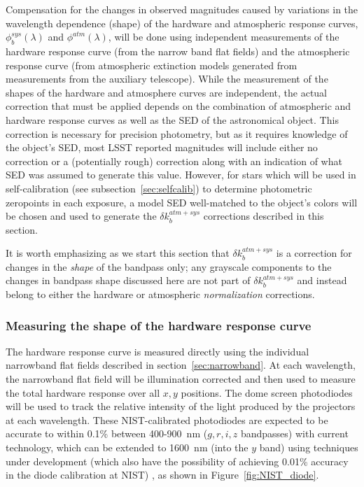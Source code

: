 \documentclass[12pt,preprint]{aastex}
\begin{document}
Compensation for the changes in observed magnitudes caused by
variations in the wavelength dependence (shape) of the hardware and
atmospheric response curves, $\phi_b^{sys}(\lambda)$ and
$\phi^{atm}(\lambda)$, will be done using independent measurements of
the hardware response curve (from the narrow band flat fields) and the
atmospheric response curve (from atmospheric extinction models
generated from measurements from the auxiliary telescope).  While the
measurement of the shapes of the hardware and atmosphere curves are
independent, the actual correction that must be applied depends on the
combination of atmospheric and hardware response curves as well as the
SED of the astronomical object.  This correction is necessary for
precision photometry, but as it requires knowledge of the object's
SED, most LSST reported magnitudes will include either no correction
or a (potentially rough) correction along with an indication of what
SED was assumed to generate this value. However, for stars which will
be used in self-calibration (see subsection~\ref{sec:selfcalib}) to
determine photometric zeropoints in each exposure, a model SED
well-matched to the object's colors will be chosen and used to
generate the $\delta k_b^{atm+sys}$ corrections described in this
section.

It is worth emphasizing as we start this section that $\delta
k_b^{atm+sys}$ is a correction for changes in the {\it shape} of the
bandpass only; any grayscale components to the changes in bandpass
shape discussed here are not part of $\delta k_b^{atm+sys}$ and instead
belong to either the hardware or atmospheric {\it normalization}
corrections.

\subsubsection{Measuring the shape of the hardware response curve}
\label{sec:phi_hardware}

The hardware response curve is measured directly using the individual
narrowband flat fields described in section~\ref{sec:narrowband}. At
each wavelength, the narrowband flat field will be illumination
corrected and then used to measure the total hardware response over
all $x,y$ positions. The dome screen photodiodes will be used to track
the relative intensity of the light produced by the projectors at each
wavelength. These NIST-calibrated photodiodes are expected to be
accurate to within 0.1\% between 400-900~nm ($g,r,i,z$ bandpasses)
with current technology, which can be extended to 1600~nm (into the
$y$ band) using techniques under development (which also have the
possibility of achieving 0.01\% accuracy in the diode calibration at
NIST) \citep{Eppeldauer09}, as shown in Figure~\ref{fig:NIST_diode}. 
\end{document}
